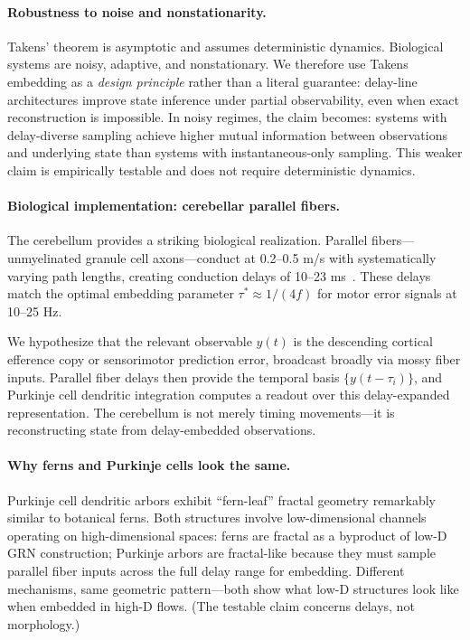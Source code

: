 \paragraph{Robustness to noise and nonstationarity.}
Takens' theorem is asymptotic and assumes deterministic dynamics. Biological systems are noisy, adaptive, and nonstationary. We therefore use Takens embedding as a \emph{design principle} rather than a literal guarantee: delay-line architectures improve state inference under partial observability, even when exact reconstruction is impossible. In noisy regimes, the claim becomes: systems with delay-diverse sampling achieve higher mutual information between observations and underlying state than systems with instantaneous-only sampling. This weaker claim is empirically testable and does not require deterministic dynamics.

\paragraph{Biological implementation: cerebellar parallel fibers.}
The cerebellum provides a striking biological realization. Parallel fibers---unmyelinated granule cell axons---conduct at 0.2--0.5 m/s with systematically varying path lengths, creating conduction delays of 10--23 ms~\cite{braitenberg1958,llinas1982}. These delays match the optimal embedding parameter $\tau^* \approx 1/(4f)$ for motor error signals at 10--25 Hz.

We hypothesize that the relevant observable $y(t)$ is the descending cortical efference copy or sensorimotor prediction error, broadcast broadly via mossy fiber inputs. Parallel fiber delays then provide the temporal basis $\{y(t-\tau_i)\}$, and Purkinje cell dendritic integration computes a readout over this delay-expanded representation. The cerebellum is not merely timing movements---it is reconstructing state from delay-embedded observations.

\paragraph{Why ferns and Purkinje cells look the same.}
Purkinje cell dendritic arbors exhibit ``fern-leaf'' fractal geometry remarkably similar to botanical ferns. Both structures involve low-dimensional channels operating on high-dimensional spaces: ferns are fractal as a byproduct of low-D GRN construction; Purkinje arbors are fractal-like because they must sample parallel fiber inputs across the full delay range for embedding. Different mechanisms, same geometric pattern---both show what low-D structures look like when embedded in high-D flows. (The testable claim concerns delays, not morphology.)

